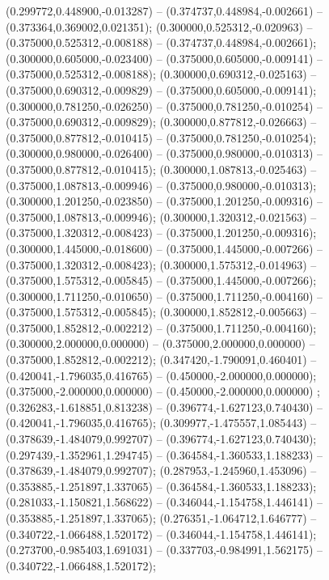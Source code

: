 (0.299772,0.448900,-0.013287) -- (0.374737,0.448984,-0.002661) -- (0.373364,0.369002,0.021351);
 (0.300000,0.525312,-0.020963) -- (0.375000,0.525312,-0.008188) -- (0.374737,0.448984,-0.002661);
 (0.300000,0.605000,-0.023400) -- (0.375000,0.605000,-0.009141) -- (0.375000,0.525312,-0.008188);
 (0.300000,0.690312,-0.025163) -- (0.375000,0.690312,-0.009829) -- (0.375000,0.605000,-0.009141);
 (0.300000,0.781250,-0.026250) -- (0.375000,0.781250,-0.010254) -- (0.375000,0.690312,-0.009829);
 (0.300000,0.877812,-0.026663) -- (0.375000,0.877812,-0.010415) -- (0.375000,0.781250,-0.010254);
 (0.300000,0.980000,-0.026400) -- (0.375000,0.980000,-0.010313) -- (0.375000,0.877812,-0.010415);
 (0.300000,1.087813,-0.025463) -- (0.375000,1.087813,-0.009946) -- (0.375000,0.980000,-0.010313);
 (0.300000,1.201250,-0.023850) -- (0.375000,1.201250,-0.009316) -- (0.375000,1.087813,-0.009946);
 (0.300000,1.320312,-0.021563) -- (0.375000,1.320312,-0.008423) -- (0.375000,1.201250,-0.009316);
 (0.300000,1.445000,-0.018600) -- (0.375000,1.445000,-0.007266) -- (0.375000,1.320312,-0.008423);
 (0.300000,1.575312,-0.014963) -- (0.375000,1.575312,-0.005845) -- (0.375000,1.445000,-0.007266);
 (0.300000,1.711250,-0.010650) -- (0.375000,1.711250,-0.004160) -- (0.375000,1.575312,-0.005845);
 (0.300000,1.852812,-0.005663) -- (0.375000,1.852812,-0.002212) -- (0.375000,1.711250,-0.004160);
 (0.300000,2.000000,0.000000) -- (0.375000,2.000000,0.000000) -- (0.375000,1.852812,-0.002212);
 (0.347420,-1.790091,0.460401) -- (0.420041,-1.796035,0.416765) -- (0.450000,-2.000000,0.000000);
 (0.375000,-2.000000,0.000000) -- (0.450000,-2.000000,0.000000) ;
 (0.326283,-1.618851,0.813238) -- (0.396774,-1.627123,0.740430) -- (0.420041,-1.796035,0.416765);
 (0.309977,-1.475557,1.085443) -- (0.378639,-1.484079,0.992707) -- (0.396774,-1.627123,0.740430);
 (0.297439,-1.352961,1.294745) -- (0.364584,-1.360533,1.188233) -- (0.378639,-1.484079,0.992707);
 (0.287953,-1.245960,1.453096) -- (0.353885,-1.251897,1.337065) -- (0.364584,-1.360533,1.188233);
 (0.281033,-1.150821,1.568622) -- (0.346044,-1.154758,1.446141) -- (0.353885,-1.251897,1.337065);
 (0.276351,-1.064712,1.646777) -- (0.340722,-1.066488,1.520172) -- (0.346044,-1.154758,1.446141);
 (0.273700,-0.985403,1.691031) -- (0.337703,-0.984991,1.562175) -- (0.340722,-1.066488,1.520172);
